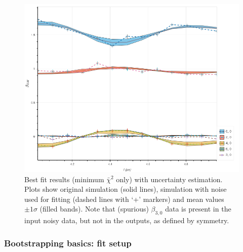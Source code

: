 \documentclass[10pt]{article}
\begin{document}
\begin{figure}[]
\begin{center}
\includegraphics[width=\textwidth,height=\dimexpr\textheight-4\baselineskip-\abovecaptionskip-\belowcaptionskip\relax,keepaspectratio]{figures/dataDump_1000fitTests_multiFit_noise_051021_BLMdataAgg_090323_19-42-12.png}
\caption{Best fit results (minimum \(\bar{\chi}^2\) only) with uncertainty estimation. Plots show original simulation (solid lines), simulation with noise used for fitting (dashed lines with `+' markers) and mean values \(\pm1\sigma\) (filled bands). Note that (spurious) \(\beta_{3,0}\) data is present in the input noisy data, but not in the outputs, as defined by symmetry.\label{743962}}
\end{center}
\end{figure}

\subsubsection{Bootstrapping basics: fit setup}
\end{document}
